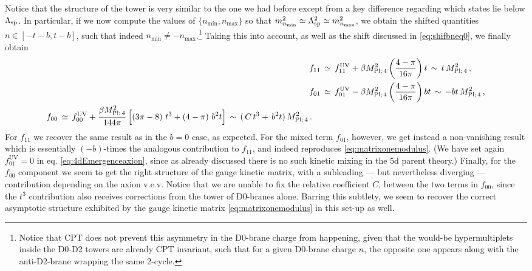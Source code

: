 Notice that the structure of the tower is very similar to the one we had before except from a key difference regarding which states lie below $\Lambda_{\text{sp}}$. In particular, if we now compute the values of $\{n_{\text{min}}, n_{\text{max}}\}$ so that $m_{n_{\text{min}}}^2 \simeq \Lambda_{\text{sp}}^2 \simeq m_{n_{\text{max}}}^2$, we obtain the shifted quantities $n \in [-t-b, t-b]$, such that indeed $n_{\text{min}} \neq -n_{\text{max}}$.\footnote{Notice that CPT does not prevent this asymmetry in the D0-brane charge from happening, given that the would-be hypermultiplets inside the D0-D2 towers are already CPT invariant, such that for a given D0-brane charge $n$, the opposite one appears along with the anti-D2-brane wrapping the same 2-cycle.} Taking this into account, as well as the shift discussed in \eqref{eq:shifbneq0}, we finally obtain
%
\begin{align}\label{eq:4dEmergenceaxion}
			f_{11}&\, \simeq\, f_{11}^{\text{UV}} + \beta M_{\text{Pl;}\, 4}^2 \left( \frac{4-\pi}{16 \pi }\right) t\, \sim\,   t \, M_{\text{Pl;}\, 4}^2 \, ,\\ 
			f_{01}&\, \simeq\, f_{01}^{\text{UV}} - \beta M_{\text{Pl;}\, 4}^2 \left( \frac{4-\pi}{16 \pi }\right) b t\, \sim \, - b  t\, M_{\text{Pl;}\, 4}^2 \, ,\\
			\begin{split}
				f_{00}&\, \simeq\, f_{00}^{\text{UV}} + \frac{\beta M_{\text{Pl;}\, 4}^2}{144 \pi } \left[  \left( 3\pi -8  \right) \, t^3 + \left( 4 -\pi \right)\,  b^2 t \right]\, \sim\, (\, C \, t^3 +  \,  b^2 t)\, M_{\text{Pl;}\, 4}^2\, .
			\end{split}
\end{align}
%
For $f_{11}$ we recover the same result as in the $b=0$ case, as expected. For the mixed term $f_{01}$, however, we get instead a non-vanishing result which is essentially $(-b)$-times the analogous contribution to $f_{11}$, and indeed reproduces \eqref{eq:matrixonemodulus}. (We have set again $f_{01}^{\text{UV}}=0$ in eq. \eqref{eq:4dEmergenceaxion}, since as already discussed there is no such kinetic mixing in the 5d parent theory.) Finally, for the $f_{00}$ component we seem to get the right structure of the gauge kinetic matrix, with a subleading --- but nevertheless diverging --- contribution depending on the axion v.e.v. Notice that we are unable to fix the relative coefficient $C$,  between the two terms in $f_{00}$, since the $t^3$ contribution also receives corrections from the tower of D0-branes alone. %
Barring this subtlety, we seem to recover the correct asymptotic structure exhibited by the gauge kinetic matrix \eqref{eq:matrixonemodulus} in this set-up as well.

